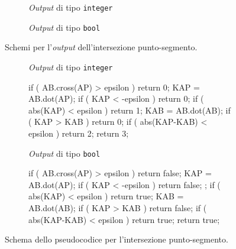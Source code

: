 \begin{figure}[h!]
	\hfill
	\begin{subfigure}{.45\textwidth}
		\centering
		\caption{\textit{Output} di tipo \texttt{integer}}
	\end{subfigure}
	\hfill
	\begin{subfigure}{.45\textwidth}
		\centering
		\caption{\textit{Output} di tipo \texttt{bool}}
	\end{subfigure}
	\hfill
	\caption{Schemi per l'\textit{output} dell'intersezione punto-segmento.}
\end{figure}
\begin{figure}[h!]
	\hfill
	\begin{subfigure}[t]{.45\linewidth}
	\raggedright
	\textit{Output} di tipo \texttt{integer}\\
	\vspace{.5em}
	\begin{pseudoc}
	if ( AB.cross(AP) > epsilon )
		{ return 0; }
	KAP = AB.dot(AP);
	if ( KAP < -epsilon )
		{ return 0; }
	if ( abs(KAP) < epsilon  )
		{ return 1; }
	KAB = AB.dot(AB);
	if ( KAP > KAB )
		{ return 0; }
	if ( abs(KAP-KAB) < epsilon )
		{ return 2; }
	return 3;
	\end{pseudoc}
	\end{subfigure}
	\hfill
	\begin{subfigure}[t]{.45\textwidth}
	\raggedright
	\textit{Output} di tipo \texttt{bool}\\
	\vspace{.5em}
	\begin{pseudoc}
	if ( AB.cross(AP) > epsilon )
		{ return false; }
	KAP = AB.dot(AP);
	if ( KAP < -epsilon )
		{ return false; };
	if ( abs(KAP) < epsilon )
		{ return true; }
	KAB = AB.dot(AB);
	if ( KAP > KAB ) 
		{ return false; }
	if ( abs(KAP-KAB) < epsilon )
		{ return true; }
	return true;
	\end{pseudoc}
	\end{subfigure}
	\hfill
	\caption{Schema dello pseudocodice per l'intersezione punto-segmento.}
	\label{pointsegment}
\end{figure}
%
